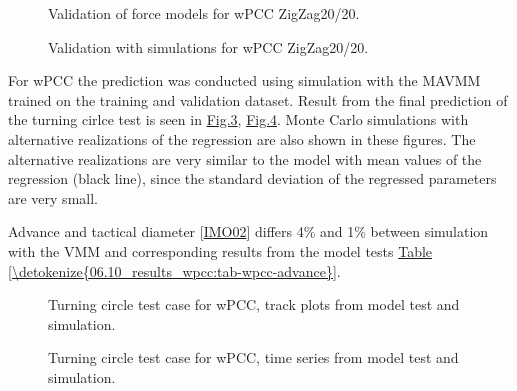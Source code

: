 \documentclass[review]{elsarticle}
\begin{document}
\begin{figure}[H]
\centering
\capstart

\noindent{}
\caption{Validation of force models for wPCC ZigZag20/20.}\label{\detokenize{06.10_results_wpcc:fig-validation-forces}}\end{figure}

\begin{figure}[H]
\centering
\capstart

\noindent{}
\caption{Validation with simulations for wPCC ZigZag20/20.}\label{\detokenize{06.10_results_wpcc:fig-validation-sim}}\end{figure}

\sphinxAtStartPar
For wPCC the prediction was conducted using simulation with the MAVMM trained on the training and validation dataset. Result from the final prediction of the turning cirlce test is seen in \hyperref[\detokenize{06.10_results_wpcc:fig-track-plot-testing-sim}]{Fig.\@ \ref{\detokenize{06.10_results_wpcc:fig-track-plot-testing-sim}}}, \hyperref[\detokenize{06.10_results_wpcc:fig-testing-sim}]{Fig.\@ \ref{\detokenize{06.10_results_wpcc:fig-testing-sim}}}. Monte Carlo simulations with alternative realizations of the regression are also shown in these figures. The alternative realizations are very similar to the model with mean values of the regression (black line), since the standard deviation of the regressed parameters are very small.

\sphinxAtStartPar
Advance and tactical diameter {[}\hyperlink{cite.bibligraphy:id16}{IMO02}{]} differs 4\% and 1\% between simulation with the VMM and corresponding results from the model tests \hyperref[\detokenize{06.10_results_wpcc:tab-wpcc-advance}]{Table \ref{\detokenize{06.10_results_wpcc:tab-wpcc-advance}}}.

\begin{figure}[H]
\centering
\capstart

\noindent{}
\caption{Turning circle test case for wPCC, track plots from model test and simulation.}\label{\detokenize{06.10_results_wpcc:fig-track-plot-testing-sim}}\end{figure}

\begin{figure}[H]
\centering
\capstart

\noindent{}
\caption{Turning circle test case for wPCC, time series from model test and simulation.}\label{\detokenize{06.10_results_wpcc:fig-testing-sim}}\end{figure}
\end{document}
